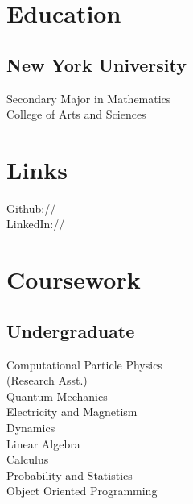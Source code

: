 \documentclass[]{deedy-resume-openfont}
\begin{document}
\lastupdated


%
%

\begin{minipage}[t]{0.33\textwidth} 


\section{Education} 

\subsection{New York University}

Secondary Major in Mathematics \\
College of Arts and Sciences\\
\sectionsep


\section{Links} 
Github:// \href{https://github.com/jcorrado76}{} \\
LinkedIn://  \href{https://www.linkedin.com/in/joseph-corrado-9737b2a6/}{} \\
\sectionsep


\section{Coursework}

\subsection{Undergraduate}
Computational Particle Physics \\
(Research Asst.)\\
Quantum Mechanics\\
Electricity and Magnetism\\
Dynamics\\
Linear Algebra\\
Calculus\\
Probability and Statistics\\
Object Oriented Programming\\
\sectionsep


\end{minipage}
\end{document}

